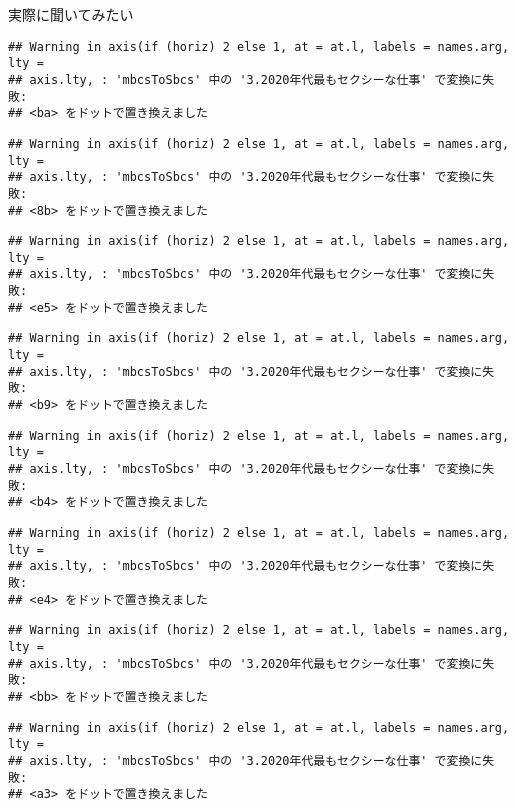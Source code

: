 \documentclass[ignorenonframetext,]{beamer}
\begin{document}
\begin{frame}[fragile]{実際に聞いてみたい}
\begin{verbatim}
## Warning in axis(if (horiz) 2 else 1, at = at.l, labels = names.arg, lty =
## axis.lty, : 'mbcsToSbcs' 中の '3.2020年代最もセクシーな仕事' で変換に失敗:
## <ba> をドットで置き換えました
\end{verbatim}

\begin{verbatim}
## Warning in axis(if (horiz) 2 else 1, at = at.l, labels = names.arg, lty =
## axis.lty, : 'mbcsToSbcs' 中の '3.2020年代最もセクシーな仕事' で変換に失敗:
## <8b> をドットで置き換えました
\end{verbatim}

\begin{verbatim}
## Warning in axis(if (horiz) 2 else 1, at = at.l, labels = names.arg, lty =
## axis.lty, : 'mbcsToSbcs' 中の '3.2020年代最もセクシーな仕事' で変換に失敗:
## <e5> をドットで置き換えました
\end{verbatim}

\begin{verbatim}
## Warning in axis(if (horiz) 2 else 1, at = at.l, labels = names.arg, lty =
## axis.lty, : 'mbcsToSbcs' 中の '3.2020年代最もセクシーな仕事' で変換に失敗:
## <b9> をドットで置き換えました
\end{verbatim}

\begin{verbatim}
## Warning in axis(if (horiz) 2 else 1, at = at.l, labels = names.arg, lty =
## axis.lty, : 'mbcsToSbcs' 中の '3.2020年代最もセクシーな仕事' で変換に失敗:
## <b4> をドットで置き換えました
\end{verbatim}

\begin{verbatim}
## Warning in axis(if (horiz) 2 else 1, at = at.l, labels = names.arg, lty =
## axis.lty, : 'mbcsToSbcs' 中の '3.2020年代最もセクシーな仕事' で変換に失敗:
## <e4> をドットで置き換えました
\end{verbatim}

\begin{verbatim}
## Warning in axis(if (horiz) 2 else 1, at = at.l, labels = names.arg, lty =
## axis.lty, : 'mbcsToSbcs' 中の '3.2020年代最もセクシーな仕事' で変換に失敗:
## <bb> をドットで置き換えました
\end{verbatim}

\begin{verbatim}
## Warning in axis(if (horiz) 2 else 1, at = at.l, labels = names.arg, lty =
## axis.lty, : 'mbcsToSbcs' 中の '3.2020年代最もセクシーな仕事' で変換に失敗:
## <a3> をドットで置き換えました
\end{verbatim}


\end{frame}
\end{document}
